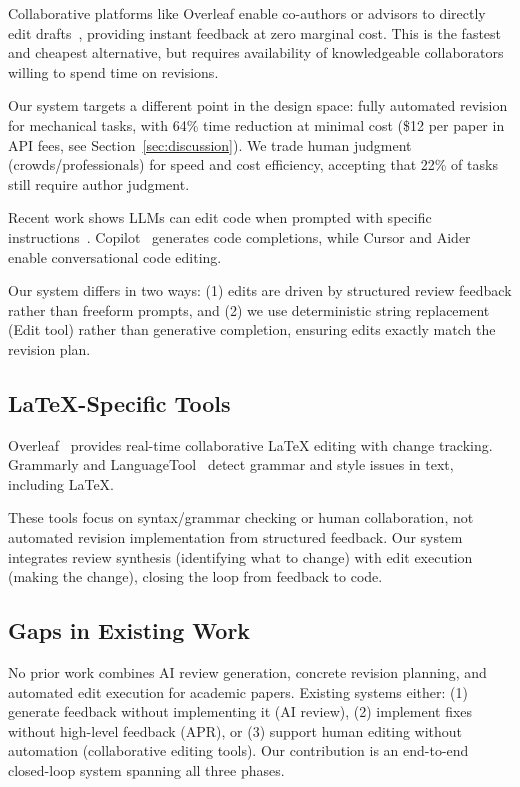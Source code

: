 Collaborative platforms like Overleaf enable co-authors or advisors to directly edit drafts~\cite{overleaf2023}, providing instant feedback at zero marginal cost. This is the fastest and cheapest alternative, but requires availability of knowledgeable collaborators willing to spend time on revisions.

Our system targets a different point in the design space: fully automated revision for mechanical tasks, with 64\% time reduction at minimal cost (\$12 per paper in API fees, see Section~\ref{sec:discussion}). We trade human judgment (crowds/professionals) for speed and cost efficiency, accepting that 22\% of tasks still require author judgment.

Recent work shows LLMs can edit code when prompted with specific instructions~\cite{chen2021codex}. Copilot~\cite{chen2021evaluating} generates code completions, while Cursor and Aider~\cite{aider2023} enable conversational code editing.

Our system differs in two ways: (1) edits are driven by structured review feedback rather than freeform prompts, and (2) we use deterministic string replacement (Edit tool) rather than generative completion, ensuring edits exactly match the revision plan.

\subsection{LaTeX-Specific Tools}

Overleaf~\cite{overleaf2023} provides real-time collaborative LaTeX editing with change tracking. Grammarly and LanguageTool~\cite{naber2003languagetool} detect grammar and style issues in text, including LaTeX.

These tools focus on syntax/grammar checking or human collaboration, not automated revision implementation from structured feedback. Our system integrates review synthesis (identifying what to change) with edit execution (making the change), closing the loop from feedback to code.

\subsection{Gaps in Existing Work}

No prior work combines AI review generation, concrete revision planning, and automated edit execution for academic papers. Existing systems either: (1) generate feedback without implementing it (AI review), (2) implement fixes without high-level feedback (APR), or (3) support human editing without automation (collaborative editing tools). Our contribution is an end-to-end closed-loop system spanning all three phases.